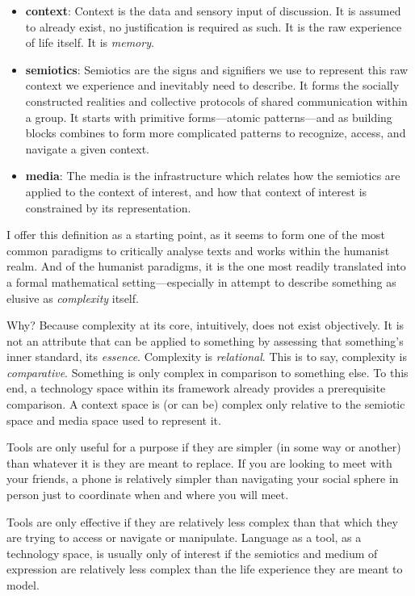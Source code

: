 \documentclass[twoside]{article}
\begin{document}
\begin{itemize}
\item {\bfseries context}: Context is the data and sensory input of discussion. It is assumed to already exist,
no justification is required as such.  It is the raw experience of life itself. It is \emph{memory}.
\item {\bfseries semiotics}: Semiotics are the signs and signifiers we use to represent this raw context we experience and
inevitably need to describe. It forms the socially constructed realities and collective protocols of shared communication
within a group. It starts with primitive forms---atomic patterns---and as building blocks combines to form more complicated
patterns to recognize, access, and navigate a given context.
\item {\bfseries media}: The media is the infrastructure which relates how the semiotics are applied to the context of interest,
and how that context of interest is constrained by its representation.
\end{itemize}

I offer this definition as a starting point, as it seems to form one of the most common paradigms to critically analyse texts
and works within the humanist realm. And of the humanist paradigms, it is the one most readily translated into a formal
mathematical setting---especially in attempt to describe something as elusive as \emph{complexity} itself.

Why? Because complexity at its core, intuitively, does not exist objectively. It is not an attribute that can be applied
to something by assessing that something's inner standard, its \emph{essence}. Complexity is \emph{relational}. This is to say,
complexity is \emph{comparative}. Something is only complex in comparison to something else. To this end, a technology space
within its framework already provides a prerequisite comparison. A context space is (or can be) complex only relative to the
semiotic space and media space used to represent it.

Tools are only useful for a purpose if they are simpler (in some way or another) than whatever it is they are meant to replace.
If you are looking to meet with your friends, a phone is relatively simpler than navigating your social sphere in person just
to coordinate when and where you will meet.

Tools are only effective if they are relatively less complex than that which they are trying to access or navigate or manipulate.
Language as a tool, as a technology space, is usually only of interest if the semiotics and medium of expression are relatively
less complex than the life experience they are meant to model.
\end{document}
